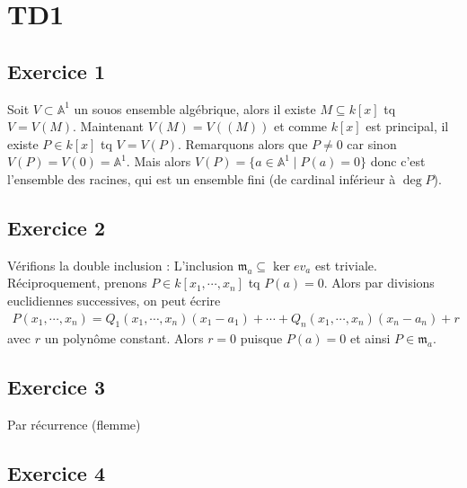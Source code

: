 \chapter{TD1}
    \section*{Exercice 1}
        Soit $V \subset \mathbb{A}^1$ un souos ensemble algébrique, alors il existe $M \subseteq k[x]$ tq $V = V(M)$. Maintenant $V(M) = V((M))$ et comme $k[x]$ est principal, il existe $P \in k[x]$ tq $V = V(P)$. Remarquons alors que $P \neq 0$ car sinon $V(P) = V(0) = \mathbb{A}^1$. Mais alors $V(P) = \{a \in \mathbb{A}^1 \mid P(a) = 0\}$ donc c'est l'ensemble des racines, qui est un ensemble fini (de cardinal inférieur à $\deg P$).

    \section*{Exercice 2}
        Vérifions la double inclusion : L'inclusion $\mathfrak{m}_a \subseteq \ker ev_a$ est triviale. Réciproquement, prenons $P \in k[x_1, \cdots, x_n]$ tq $P(a) = 0$. Alors par divisions euclidiennes successives, on peut écrire
        \begin{align*}
            P(x_1, \cdots, x_n) = Q_1(x_1, \cdots, x_n)(x_1 - a_1) + \cdots + Q_n(x_1, \cdots, x_n)(x_n - a_n) + r
        \end{align*}
        avec $r$ un polynôme constant. Alors $r = 0$ puisque $P(a) = 0$ et ainsi $P \in \mathfrak{m}_a$.

    \section*{Exercice 3}
        Par récurrence (flemme)
    
    \section*{Exercice 4}
        
